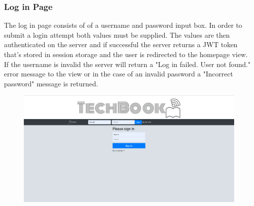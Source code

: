\subsubsection{Log in Page}  \label{loginpage}

The log in page consists of of a username and password input box. In order to submit a login attempt both values must be supplied. The values are then authenticated on the server and if successful the server returns a JWT token that's stored in session storage and the user is redirected to the homepage view.  If the username is invalid the server will return a "Log in failed. User not found." error message to the view or in the case of an invalid password a "Incorrect password" message is returned.
\begin{figure}[H]
\centering
\begin{minipage}{.75\textwidth}
  \centering
  \includegraphics[width=.9\linewidth]{img/ui/login_PC.PNG}
  \label{fig:loginPC}
\end{minipage}%
\begin{minipage}{.25\textwidth}
  \centering

\end{minipage}
\end{figure}

